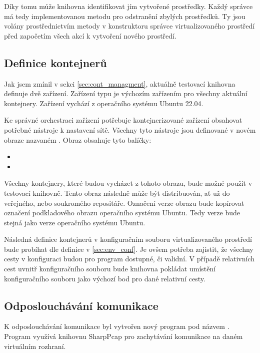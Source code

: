 Díky tomu může knihovna identifikovat jím vytvořené prostředky. Každý správce má tedy implementovanou metodu pro odstranění zbylých prostředků. Ty jsou volány prostřednictvím metody  v konstruktoru správce virtualizovaného prostředí před započetím všech akcí k vytvoření nového prostředí.

\subsection{Definice kontejnerů}

Jak jsem zmínil v sekci \ref{sec:cont_managment}, aktuálně testovací knihovna definuje dvě zařízení. Zařízení typu  je výchozím zařízením pro všechny aktuální kontejnery. Zařízení vychází z operačního systému Ubuntu 22.04. 

Ke správné orchestraci zařízení potřebuje kontejnerizované zařízení obsahovat potřebné nástroje k nastavení sítě. Všechny tyto nástroje jsou definované v novém obraze nazvaném . Obraz obsahuje tyto balíčky:

\begin{itemize}
    \item {}
    \item {}
\end{itemize}

Všechny kontejnery, které budou vycházet z tohoto obrazu, bude možné použít v testovací knihovně. Tento obraz následně může být distribuován, ať už do veřejného, nebo soukromého repositáře. Označení verze obrazu bude kopírovat označení podkladového obrazu operačního systému Ubuntu. Tedy verze bude stejná jako verze operačního systému Ubuntu. 

Následná definice kontejnerů v konfiguračním souboru virtualizovaného prostředí bude probíhat dle definice v \ref{sec:env_conf}. Je ovšem potřeba zajistit, že všechny cesty v konfiguraci budou pro program dostupné, či validní. V případě relativních cest uvnitř konfiguračního souboru bude knihovna pokládat umístění konfiguračního souboru jako výchozí bod pro dané relativní cesty.

\subsection{Odposlouchávání komunikace}

K odposlouchávání komunikace byl vytvořen nový program pod názvem . Program využívá knihovnu SharpPcap\cite{sharppcap} pro zachytávání komunikace na daném virtuálním rozhraní. 

